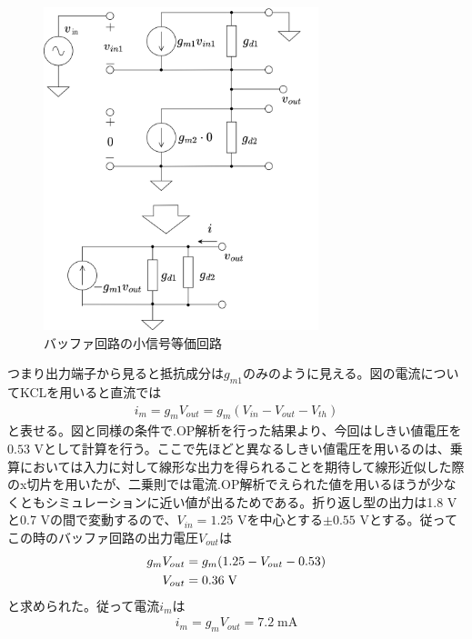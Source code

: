 \documentclass[twocolumn]{jsarticle}
\begin{document}
        \begin{figure}[H]
            \begin{center}
                \includegraphics*[width = 80mm]{figures/buf_equal.png}
                \caption{バッファ回路の小信号等価回路}
                \label{fig:buf_eq}
            \end{center}
        \end{figure}
        つまり出力端子から見ると抵抗成分は$g_{m1}$のみのように見える。図の電流についてKCLを用いると直流では
        \begin{align}
            i_{m}=g_{m}V_{out}=g_{m}(V_{in}-V_{out}-V_{th})
        \end{align}
        と表せる。図と同様の条件で.OP解析を行った結果より、今回はしきい値電圧を$0.53$ Vとして計算を行う。ここで先ほどと異なるしきい値電圧を用いるのは、乗算においては入力に対して線形な出力を得られることを期待して線形近似した際のx切片を用いたが、二乗則では電流.OP解析でえられた値を用いるほうが少なくともシミュレーションに近い値が出るためである。折り返し型の出力は1.8 Vと0.7 Vの間で変動するので、$V_{in}=1.25$ Vを中心とする$\pm 0.55$ Vとする。従ってこの時のバッファ回路の出力電圧$V_{out}$は
        \begin{align}
            g_{m}V_{out} &=g_{m}(1.25-V_{out}-0.53)     \notag\\
            V_{out}&=0.36\;\mathrm{V}   \notag
        \end{align}
        と求められた。従って電流$i_{m}$は
        \begin{align*}
            i_{m}=g_{m}V_{out}=7.2\;\mathrm{mA}
        \end{align*}
\end{document}
